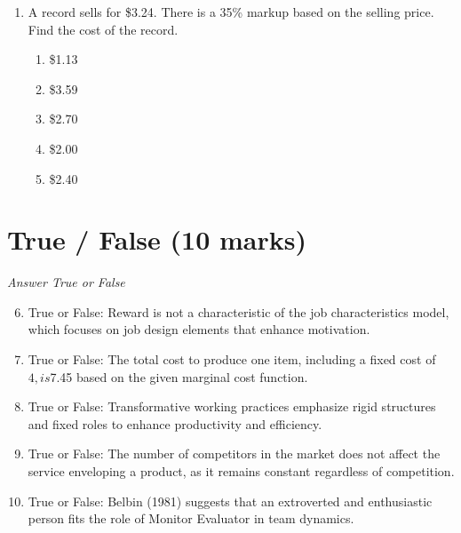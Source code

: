 \documentclass[12pt]{article}
\begin{document}
\begin{enumerate}[label=\arabic*.]
\begin{enumerate}[label=(\alph*)]
    \item \$14.95
    \item \$15.95
    \item \$16.00
    \item \$14.50
    \item \$15.05
\end{enumerate}
\item A record sells for \$3.24. There is a 35\% markup based on the selling price. Find the cost of the record.
\begin{enumerate}[label=(\alph*)]
    \item \$1.13
    \item \$3.59
    \item \$2.70
    \item \$2.00
    \item \$2.40
\end{enumerate}
\end{enumerate}

\section*{True / False (10 marks)}
\textit{Answer True or False}
\begin{enumerate}[label=\arabic*.]
\setcounter{enumi}{5}
\item True or False: Reward is not a characteristic of the job characteristics model, which focuses on job design elements that enhance motivation.
\item True or False: The total cost to produce one item, including a fixed cost of $4, is $7.45 based on the given marginal cost function.
\item True or False: Transformative working practices emphasize rigid structures and fixed roles to enhance productivity and efficiency.
\item True or False: The number of competitors in the market does not affect the service enveloping a product, as it remains constant regardless of competition.
\item True or False: Belbin (1981) suggests that an extroverted and enthusiastic person fits the role of Monitor Evaluator in team dynamics.
\end{enumerate}
\end{document}
